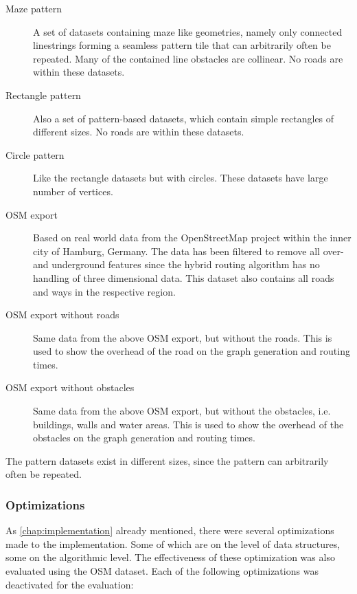 			\begin{description}
				\item[Maze pattern] A set of datasets containing maze like geometries, namely only connected linestrings forming a seamless pattern tile that can arbitrarily often be repeated. Many of the contained line obstacles are collinear. No roads are within these datasets.
				\item[Rectangle pattern] Also a set of pattern-based datasets, which contain simple rectangles of different sizes. No roads are within these datasets.
				\item[Circle pattern] Like the rectangle datasets but with circles. These datasets have large number of vertices.
				\item[OSM export] Based on real world data from the OpenStreetMap project within the inner city of Hamburg, Germany. The data has been filtered to remove all over- and underground features since the hybrid routing algorithm has no handling of three dimensional data. This dataset also contains all roads and ways in the respective region.
				\item[OSM export without roads] Same data from the above OSM export, but without the roads. This is used to show the overhead of the road on the graph generation and routing times.
				\item[OSM export without obstacles] Same data from the above OSM export, but without the obstacles, i.e. buildings, walls and water areas. This is used to show the overhead of the obstacles on the graph generation and routing times.
			\end{description}
			
			The pattern datasets exist in different sizes, since the pattern can arbitrarily often be repeated.
			
			
		
		\subsubsection{Optimizations}
		
			As \cref{chap:implementation} already mentioned, there were several optimizations made to the implementation.
			Some of which are on the level of data structures, some on the algorithmic level.
			The effectiveness of these optimization was also evaluated using the OSM dataset.
			Each of the following optimizations was deactivated for the evaluation:

